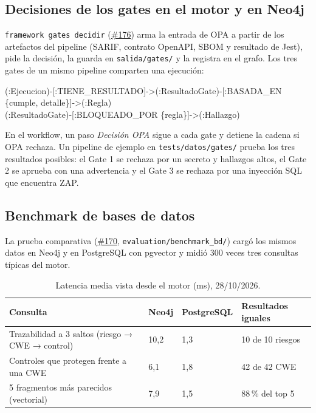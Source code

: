 \documentclass[11pt,a4paper]{report}
\newcommand{\pr}[1]{\href{https://github.com/PracticasESPE/Framework_Desarrollo_Seguro/pull/#1}{\##1}}
\begin{document}
\subsection{Decisiones de los gates en el motor y en Neo4j}
\texttt{framework gates decidir} (\pr{176}) arma la entrada de OPA a partir de los artefactos del
pipeline (SARIF, contrato OpenAPI, SBOM y resultado de Jest), pide la decisión, la guarda en
\texttt{salida/gates/} y la registra en el grafo. Los tres gates de un mismo pipeline comparten
una ejecución:

\begin{center}
\small\ttfamily
(:Ejecucion)-[:TIENE\_RESULTADO]->(:ResultadoGate)-[:BASADA\_EN \{cumple, detalle\}]->(:Regla)\\
(:ResultadoGate)-[:BLOQUEADO\_POR \{regla\}]->(:Hallazgo)
\end{center}

En el workflow, un paso \emph{Decisión OPA} sigue a cada gate y detiene la cadena si OPA rechaza.
Un pipeline de ejemplo en \texttt{tests/datos/gates/} prueba los tres resultados posibles: el
Gate 1 se rechaza por un secreto y hallazgos altos, el Gate 2 se aprueba con una advertencia y el
Gate 3 se rechaza por una inyección SQL que encuentra ZAP.

\subsection{Benchmark de bases de datos}
La prueba comparativa (\pr{170}, \texttt{evaluation/benchmark\_bd/}) cargó los mismos datos en
Neo4j y en PostgreSQL con pgvector y midió 300 veces tres consultas típicas del motor.

\begin{table}[H]
\centering
\caption{Latencia media vista desde el motor (ms), 28/10/2026.}
\begin{tabularx}{\textwidth}{@{}LP{2.0cm}P{2.2cm}P{2.6cm}@{}}
\toprule
\textbf{Consulta} & \textbf{Neo4j} & \textbf{PostgreSQL} & \textbf{Resultados iguales}\\
\midrule
Trazabilidad a 3 saltos (riesgo → CWE → control) & 10,2 & 1,3 & 10 de 10 riesgos\\
Controles que protegen frente a una CWE & 6,1 & 1,8 & 42 de 42 CWE\\
5 fragmentos más parecidos (vectorial) & 7,9 & 1,5 & 88\,\% del top 5\\
\bottomrule
\end{tabularx}
\end{table}
\end{document}
